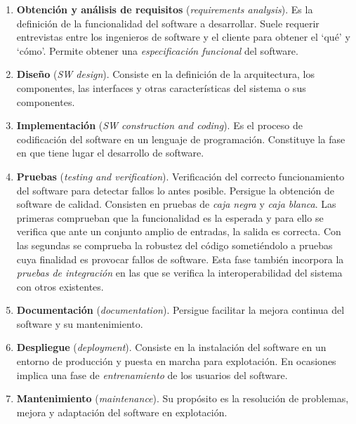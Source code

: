 \begin{enumerate}[1.-]
\item \textbf{Obtención y análisis de requisitos}
(\emph{requirements analysis}). Es la definición de la funcionalidad del 
software a desarrollar. Suele requerir entrevistas entre los ingenieros de software 
y el cliente para obtener el `qué' y `cómo'. Permite obtener una 
\emph{especificación funcional} del software.

\item \textbf{Diseño} (\emph{SW design}). Consiste en la 
definición de la arquitectura, los componentes, las interfaces y otras 
características del sistema o sus componentes.

\item \textbf{Implementación} (\emph{SW construction and coding}). Es el
  proceso de codificación del software en un lenguaje de programación.
  Constituye la fase en que tiene lugar el desarrollo de software.

\item \textbf{Pruebas} (\emph{testing and verification}).
Verificación del correcto funcionamiento del software para detectar fallos lo 
antes posible. Persigue la obtención de software de calidad. Consisten en 
pruebas de \emph{caja negra} y \emph{caja blanca}. Las primeras comprueban 
que la funcionalidad es la esperada y para ello se verifica que ante un 
conjunto amplio de entradas, la salida es correcta. Con las segundas se 
comprueba la robustez del código sometiéndolo a pruebas cuya finalidad es 
provocar fallos de software. Esta fase también incorpora la \emph{pruebas de 
integración} en las que se verifica la interoperabilidad del sistema con 
otros existentes.

\item \textbf{Documentación} (\emph{documentation}). Persigue facilitar la mejora continua del software y su mantenimiento.

\item \textbf{Despliegue} (\emph{deployment}). Consiste en 
la instalación del software en un entorno de producción y puesta en marcha 
para explotación. En ocasiones implica una fase de \emph{entrenamiento} de 
los usuarios del software.

\item \textbf{Mantenimiento} (\emph{maintenance}). Su 
propósito es la resolución de problemas, mejora y adaptación del software en 
explotación.
\end{enumerate}




